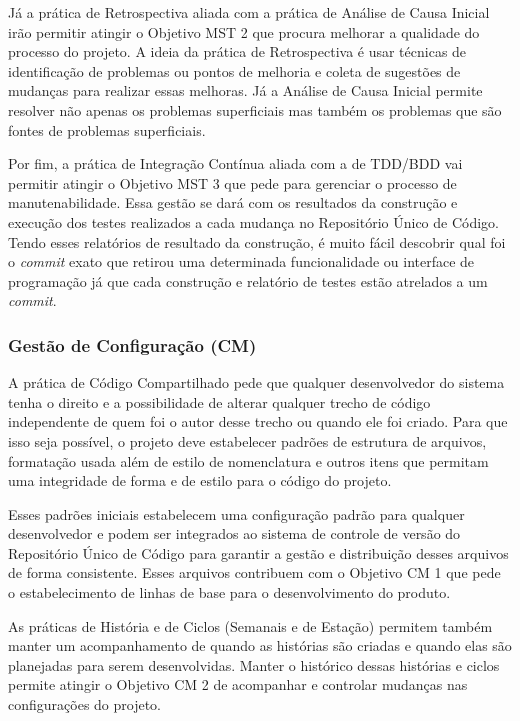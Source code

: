 Já a prática de Retrospectiva aliada com a prática de Análise de Causa
Inicial irão permitir atingir o Objetivo MST 2 que procura melhorar a
qualidade do processo do projeto. A ideia da prática de Retrospectiva
\cite{Derby2006} é usar técnicas de identificação de problemas ou
pontos de melhoria e coleta de sugestões de mudanças para realizar
essas melhoras. Já a Análise de Causa Inicial permite resolver não
apenas os problemas superficiais mas também os problemas que são
fontes de problemas superficiais.

Por fim, a prática de Integração Contínua aliada com a de TDD/BDD vai
permitir atingir o Objetivo MST 3 que pede para gerenciar o processo
de manutenabilidade. Essa gestão se dará com os resultados da
construção e execução dos testes realizados a cada mudança no
Repositório Único de Código. Tendo esses relatórios de resultado da
construção, é muito fácil descobrir qual foi o \textit{commit} exato
que retirou uma determinada funcionalidade ou interface de programação
já que cada construção e relatório de testes estão atrelados a um
\textit{commit}.

\subsubsection{Gestão de Configuração (CM)}
\label{sec:+cm}

A prática de Código Compartilhado pede que qualquer desenvolvedor do
sistema tenha o direito e a possibilidade de alterar qualquer trecho
de código independente de quem foi o autor desse trecho ou quando ele
foi criado. Para que isso seja possível, o projeto deve estabelecer
padrões de estrutura de arquivos, formatação usada além de estilo de
nomenclatura e outros itens que permitam uma integridade de forma e de
estilo para o código do projeto.

Esses padrões iniciais estabelecem uma configuração padrão para
qualquer desenvolvedor e podem ser integrados ao sistema de controle
de versão do Repositório Único de Código para garantir a gestão e
distribuição desses arquivos de forma consistente. Esses arquivos
contribuem com o Objetivo CM 1 que pede o estabelecimento de linhas de
base para o desenvolvimento do produto.

As práticas de História e de Ciclos (Semanais e de Estação) permitem
também manter um acompanhamento de quando as histórias são criadas e
quando elas são planejadas para serem desenvolvidas. Manter o
histórico dessas histórias e ciclos permite atingir o Objetivo CM 2 de
acompanhar e controlar mudanças nas configurações do projeto.

